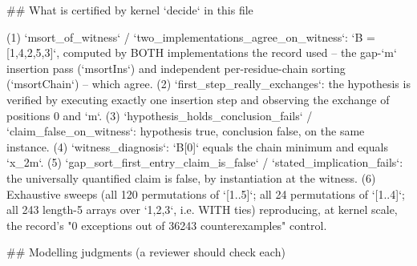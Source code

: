 \documentclass[11pt]{article}
\begin{document}
\begin{Vlean}
## What is certified by kernel `decide` in this file

  (1) `msort_of_witness` / `two_implementations_agree_on_witness`: `B = [1,4,2,5,3]`, computed
      by BOTH implementations the record used -- the gap-`m` insertion pass (`msortIns`) and
      independent per-residue-chain sorting (`msortChain`) -- which agree.
  (2) `first_step_really_exchanges`: the hypothesis is verified by executing exactly one
      insertion step and observing the exchange of positions 0 and `m`.
  (3) `hypothesis_holds_conclusion_fails` / `claim_false_on_witness`: hypothesis true,
      conclusion false, on the same instance.
  (4) `witness_diagnosis`: `B[0]` equals the chain minimum and equals `x_{2m}`.
  (5) `gap_sort_first_entry_claim_is_false` / `stated_implication_fails`: the universally
      quantified claim is false, by instantiation at the witness.
  (6) Exhaustive sweeps (all 120 permutations of `[1..5]`; all 24 permutations of `[1..4]`;
      all 243 length-5 arrays over `{1,2,3}`, i.e. WITH ties) reproducing, at kernel scale,
      the record's "0 exceptions out of 36243 counterexamples" control.

## Modelling judgments (a reviewer should check each)


\end{Vlean}
\end{document}
